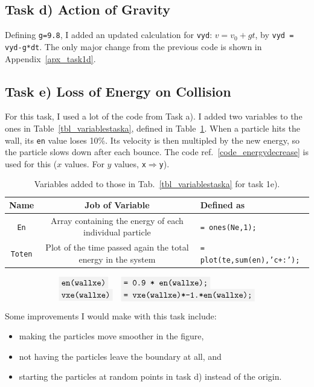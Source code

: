 \documentclass[10pt,a4paper]{article}
\newcommand{\code}[1]{\colorbox{light-gray}{\texttt{#1}}}
\begin{document}
	\subsection{Task d) Action of Gravity} 
	
	Defining \code{g=9.8}, I added an updated calculation for \code{vyd}: $ v=v_0+gt $, by \code{vyd = vyd-g*dt}. The only major change from the previous code is shown in Appendix~\ref{apx_task1d}.
	
	\subsection{Task e) Loss of Energy on Collision}	
	For this task, I used a lot of the code from Task a). I added two variables to the ones in Table~\ref{tbl_variablestaska}, defined in Table~\ref{code_define_en}. When a particle hits the wall, its \code{en} value loses 10\%. Its velocity is then multipled by the new energy, so the particle slows down after each bounce. The code ref.~\ref{code_energydecrease} is used for this ($x$ values. For $y$ values, \code{x}$\Rightarrow$\code{y}). 
	\begin{table}[h!] %
	\begin{tabular}{c|c|l}
	\textbf{Name} & \textbf{Job of Variable} & \textbf{Defined as}\\
	\hline\hline
	\code{En} & Array containing the energy of each individual particle & \code{= ones(Ne,1);}\\
	\code{Toten}& Plot of the time passed again the total energy in the system & \code{= plot(te,sum(en),'c+:');}
	\end{tabular}
	\caption{\label{code_define_en}Variables added to those in Tab.~\ref{tbl_variablestaska} for task 1e).}
	\end{table}
	
	\begin{equation}  %
	\label{code_energydecrease}
	\begin{array}{ll}
	\code{en(wallxe)}&\code{= 0.9 * en(wallxe);}\\
	\code{vxe(wallxe)}&\code{= vxe(wallxe)*-1.*en(wallxe);}
	\end{array}
	\end{equation}
	
	Some improvements I would make with this task include:
	\begin{itemize}
		\item making the particles move smoother in the figure,
		\item not having the particles leave the boundary at all, and
		\item starting the particles at random points in task d) instead of the origin.
	\end{itemize}
	
\end{document}
